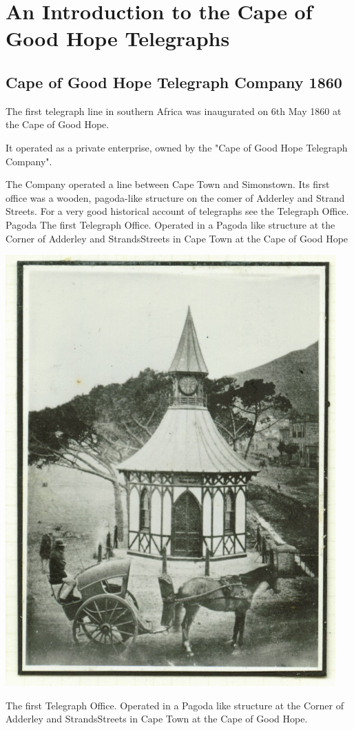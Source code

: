 \chapter{An Introduction to the Cape of Good Hope Telegraphs }


\section{Cape of Good Hope Telegraph Company 1860}

The first telegraph line in southern Africa was inaugurated on 6th May 1860 
at the Cape of Good Hope.

It operated as a private enterprise, owned by the "Cape of Good Hope 
Telegraph Company". 

The Company operated a line between Cape Town and Simonstown.  Its first office 
was a wooden, pagoda-like structure on the comer of Adderley and Strand Streets. For a very good historical account of telegraphs see the Telegraph Office.
Pagoda
The first Telegraph Office. Operated in a Pagoda like structure at the 
Corner of Adderley and StrandsStreets in Cape Town at the Cape of Good Hope

\begin{marginfigure}
\includegraphics[width=0.95\textwidth]{../cape-of-good-hope/telegraph-office/Pagoda.jpg}
\caption{
 The first Telegraph Office. Operated in a Pagoda like structure at 
 the Corner of Adderley and StrandsStreets in Cape Town at the Cape 
 of Good Hope.
}
\end{marginfigure}


